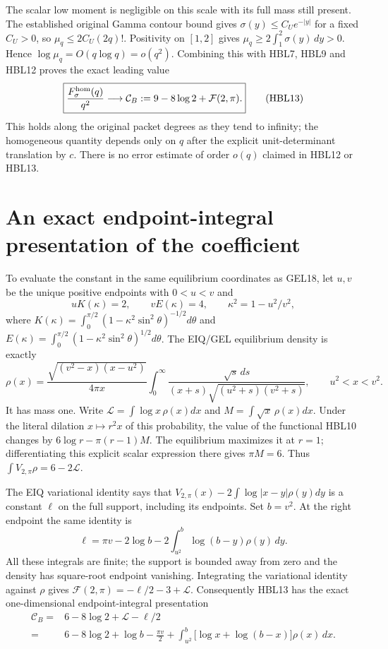 \documentclass[11pt,a4paper]{article}
\begin{document}
The scalar low moment is negligible on this scale with its full mass
still present. The established original Gamma contour bound gives
$\sigma(y)\le C_Ue^{-|y|}$ for a fixed $C_U>0$, so
$\mu_q\le2C_U(2q)!$. Positivity on $[1,2]$ gives
$\mu_q\ge2\int_1^2\sigma(y)\,dy>0$. Hence
$\log\mu_q=O(q\log q)=o(q^2)$.
Combining this with HBL7, HBL9 and HBL12 proves the exact leading value
\[
 \boxed{\frac{F_\sigma^{\rm hom}(q)}{q^2}\longrightarrow
   \mathcal C_B:=9-8\log2+\mathcal F(2,\pi).}
 \tag{HBL13}
\]
This holds along the original packet degrees as they tend to infinity;
the homogeneous quantity depends only on $q$ after the explicit
unit-determinant translation by $c$. There is no error estimate of
order $o(q)$ claimed in HBL12 or HBL13.

\section{An exact endpoint-integral presentation of the coefficient}

To evaluate the constant in the same equilibrium coordinates as GEL18,
let $u,v$ be the unique positive endpoints with $0<u<v$ and
\[
 uK(\kappa)=2,\qquad vE(\kappa)=4,\qquad
 \kappa^2=1-u^2/v^2,
\]
where
$K(\kappa)=\int_0^{\pi/2}(1-\kappa^2\sin^2\theta)^{-1/2}d\theta$
and
$E(\kappa)=\int_0^{\pi/2}(1-\kappa^2\sin^2\theta)^{1/2}d\theta$.
The EIQ/GEL equilibrium density is exactly
\[
 \rho(x)=\frac{\sqrt{(v^2-x)(x-u^2)}}{4\pi x}
   \int_0^\infty
    \frac{\sqrt s\,ds}{(x+s)\sqrt{(u^2+s)(v^2+s)}},
 \qquad u^2<x<v^2.
 \tag{HBL14}
\]
It has mass one. Write
$\mathcal L=\int\log x\,\rho(x)dx$ and
$M=\int\sqrt x\,\rho(x)dx$.
Under the literal dilation $x\mapsto r^2x$ of this probability,
the value of the functional HBL10 changes by
$6\log r-\pi(r-1)M$. The equilibrium maximizes it at $r=1$;
differentiating this explicit scalar expression there gives $\pi M=6$.
Thus $\int V_{2,\pi}\rho=6-2\mathcal L$.

The EIQ variational identity says that
$V_{2,\pi}(x)-2\int\log|x-y|\rho(y)dy$ is a constant $\ell$ on
the full support, including its endpoints. Set $b=v^2$. At the right
endpoint the same identity is
\[
 \ell=\pi v-2\log b
            -2\int_{u^2}^{b}\log(b-y)\rho(y)\,dy.
\]
All these integrals are finite; the support is bounded away from zero
and the density has square-root endpoint vanishing. Integrating the
variational identity against $\rho$ gives
$\mathcal F(2,\pi)=-\ell/2-3+\mathcal L$. Consequently HBL13 has
the exact one-dimensional endpoint-integral presentation
\[
 \boxed{\begin{aligned}
 \mathcal C_B={}&6-8\log2+\mathcal L-\ell/2\\
 ={}&6-8\log2+\log b-\frac{\pi v}{2}
       +\int_{u^2}^{b}\big[\log x+\log(b-x)\big]\rho(x)\,dx.
 \end{aligned}}
 \tag{HBL15}
\]
\end{document}
